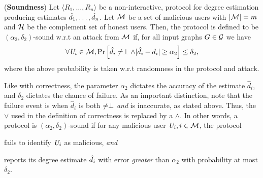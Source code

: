 \begin{defn}\label{def:sound}(\textbf{Soundness}) Let $\langle R_1, \ldots, R_n\rangle$ be a non-interactive, \ldp{} protocol for degree estimation producing estimates $\hat{d}_1, \ldots, \hat{d}_n$. Let $\mathcal{M}$ be a set of malicious users with $|\mathcal{M}| = m$ and $\mathcal{H}$ be the complement set of honest users. Then, the protocol is defined to be $(\alpha_2, \delta_2)$-sound w.r.t an attack from $\mathcal{M}$ if, for all input graphs $G \in \mathcal{G}$ we have
  \begin{gather}
    \forall \textit{U}_i \in \mathcal{M}, \mathrm{Pr}\left[\hat{d}_i \neq \perp \wedge |\hat{d}_i -
    d_i| \geq \alpha_2\right]\leq \delta_2, \label{eq:sound1}
  \end{gather}
  where the above probability is taken w.r.t randomness in the protocol and attack.
\end{defn}
Like with correctness, the parameter $\alpha_2$ dictates the accuracy of the estimate $\hat{d}_i$, and $\delta_2$ dictates the chance of failure. As an important distinction, note that the failure event is when $\hat{d}_i$ is both $\neq \perp$ \textit{and} is inaccurate, as stated above. Thus, the $\vee$ used in the definition of correctness is replaced by a $\wedge$. In other words, a protocol is $(\alpha_2,\delta_2)$-sound if for any malicious user $\textit{U}_i, i \in \mathcal{M}$, the protocol \squishlist \item fails to identify $\textit{U}_i$ as malicious, \textit{and} \item reports its degree estimate $\hat{d}_i$ with error \textit{greater} than $\alpha_2$ \squishend  with probability at most $\delta_2$.

